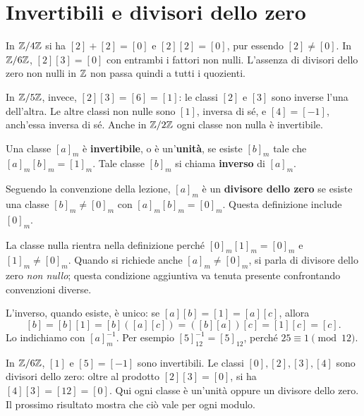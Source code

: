 \section{Invertibili e divisori dello zero}
\begin{esempio}
In $\mathbb{Z}/4\mathbb{Z}$ si ha $[2]+[2]=[0]$ e $[2][2]=[0]$, pur essendo $[2]\ne[0]$. In $\mathbb{Z}/6\mathbb{Z}$, $[2][3]=[0]$ con entrambi i fattori non nulli. L'assenza di divisori dello zero non nulli in $\mathbb{Z}$ non passa quindi a tutti i quozienti.

In $\mathbb{Z}/5\mathbb{Z}$, invece, $[2][3]=[6]=[1]$: le classi $[2]$ e $[3]$ sono inverse l'una dell'altra. Le altre classi non nulle sono $[1]$, inversa di sé, e $[4]=[-1]$, anch'essa inversa di sé. Anche in $\mathbb{Z}/2\mathbb{Z}$ ogni classe non nulla è invertibile.
\end{esempio}

\begin{definizione}
Una classe $[a]_m$ è \textbf{invertibile}, o è un'\textbf{unità}, se esiste $[b]_m$ tale che $[a]_m[b]_m=[1]_m$. Tale classe $[b]_m$ si chiama \textbf{inverso} di $[a]_m$.

Seguendo la convenzione della lezione, $[a]_m$ è un \textbf{divisore dello zero} se esiste una classe $[b]_m\ne[0]_m$ con $[a]_m[b]_m=[0]_m$. Questa definizione include $[0]_m$.
\end{definizione}

\begin{osservazione}
La classe nulla rientra nella definizione perché $[0]_m[1]_m=[0]_m$ e $[1]_m\ne[0]_m$. Quando si richiede anche $[a]_m\ne[0]_m$, si parla di divisore dello zero \emph{non nullo}; questa condizione aggiuntiva va tenuta presente confrontando convenzioni diverse.
\end{osservazione}

L'inverso, quando esiste, è unico: se $[a][b]=[1]=[a][c]$, allora
\[
[b]=[b][1]=[b]([a][c])=([b][a])[c]=[1][c]=[c].
\]
Lo indichiamo con $[a]_m^{-1}$. Per esempio $[5]_{12}^{-1}=[5]_{12}$, perché $25\equiv1\pmod{12}$.

\begin{esempio}
In $\mathbb{Z}/6\mathbb{Z}$, $[1]$ e $[5]=[-1]$ sono invertibili. Le classi $[0],[2],[3],[4]$ sono divisori dello zero: oltre al prodotto $[2][3]=[0]$, si ha $[4][3]=[12]=[0]$. Qui ogni classe è un'unità oppure un divisore dello zero. Il prossimo risultato mostra che ciò vale per ogni modulo.
\end{esempio}


